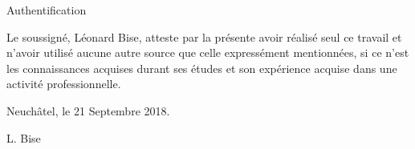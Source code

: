 \vspace*{200px}

\large{Authentification}

\begin{normalsize}

Le soussigné, Léonard Bise, atteste par la présente avoir réalisé seul ce travail et n'avoir utilisé aucune autre source que celle expressément mentionnées, si ce n'est les connaissances acquises durant ses études et son expérience acquise dans une activité professionnelle.

Neuchâtel, le 21 Septembre 2018.

\begin{flushright}
L. Bise
\end{flushright}

\end{normalsize}